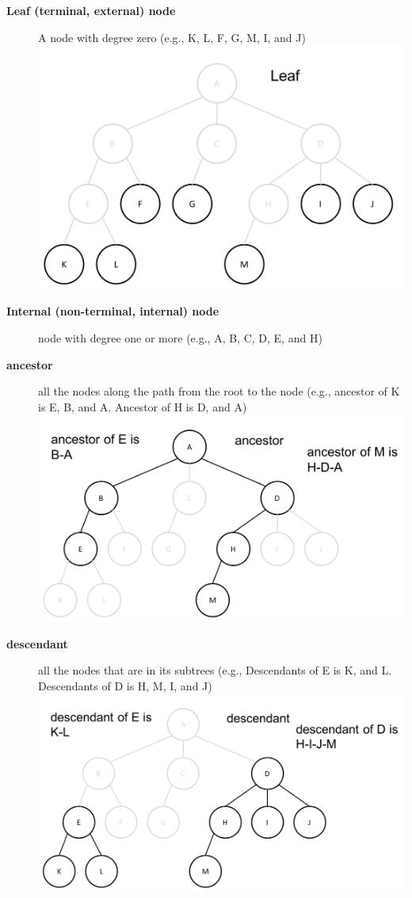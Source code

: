 \documentclass[newPxFont,sthlmFooter,nooffset]{beamer}
\begin{document}
\begin{frame}[t, allowframebreaks]
\begin{description}
  \item[\textbf{Leaf (terminal, external) node}] A node with degree
    zero (e.g., K, L, F, G, M, I, and J)\\
\includegraphics[height=0.3\textheight]{./figures/fig02_def_leaf.png}
  \item[\textbf{Internal (non-terminal, internal) node}] node with
    degree one or more (e.g., A, B, C, D, E, and H)
  \item[\textbf{ancestor}] all the nodes along the path from the root
    to the node (e.g., ancestor of K is E, B, and A. Ancestor of H
    is D, and A)\\
\includegraphics[height=0.3\textheight]{./figures/fig02_def_ancestor.png}
  \item[\textbf{descendant}] all the nodes that are in its subtrees
    (e.g., Descendants of E is K, and L. Descendants of D is H,
    M, I, and J)\\
\includegraphics[height=0.3\textheight]{./figures/fig02_def_descendant.png}

\end{description}
\end{frame}
\end{document}
